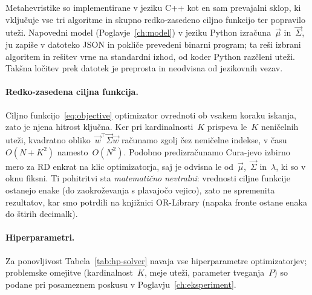 Metahevristike so implementirane v jeziku C++ kot en sam prevajalni sklop, ki vključuje vse tri algoritme in skupno redko-zasedeno ciljno funkcijo ter popravilo uteži. Napovedni model (Poglavje~\ref{ch:model}) v jeziku Python izračuna~$\vec{\mu}$ in~$\vec{\Sigma}$, ju zapiše v datoteko JSON in pokliče prevedeni binarni program; ta reši izbrani algoritem in rešitev vrne na standardni izhod, od koder Python razčleni uteži. Takšna ločitev prek datotek je preprosta in neodvisna od jezikovnih vezav.

\paragraph{Redko-zasedena ciljna funkcija.} Ciljno funkcijo~\eqref{eq:objective} optimizator ovrednoti ob vsakem koraku iskanja, zato je njena hitrost ključna. Ker pri kardinalnosti~$K$ prispeva le~$K$ neničelnih uteži, kvadratno obliko~$\vec{w}^{\!\top}\vec{\Sigma}\vec{w}$ računamo zgolj čez neničelne indekse, v času~$O(N+K^2)$ namesto~$O(N^2)$. Podobno predizračunamo Cura-jevo izbirno mero za RD enkrat na klic optimizatorja, saj je odvisna le od~$\vec{\mu}$,~$\vec{\Sigma}$ in~$\lambda$, ki so v oknu fiksni. Ti pohitritvi sta \emph{matematično nevtralni}: vrednosti ciljne funkcije ostanejo enake (do zaokroževanja s plavajočo vejico), zato ne spremenita rezultatov, kar smo potrdili na knjižnici OR-Library (napaka fronte ostane enaka do štirih decimalk).

\paragraph{Hiperparametri.} Za ponovljivost Tabela~\ref{tab:hp-solver} navaja vse hiperparametre optimizatorjev; problemske omejitve (kardinalnost~$K$, meje uteži, parameter tveganja~$P$) so podane pri posameznem poskusu v Poglavju~\ref{ch:eksperiment}.

